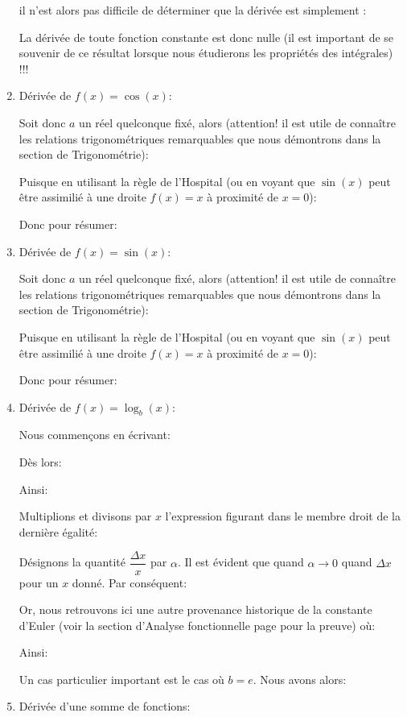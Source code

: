 \begin{enumerate}
		 il n'est alors pas difficile de déterminer que la dérivée est simplement :
		 
		 La dérivée de toute fonction constante est donc nulle (il est important de se souvenir de ce résultat lorsque nous étudierons les propriétés des intégrales) !!!
		 
		 \item Dérivée de $f(x)=\cos(x)$:
		 
		 Soit donc $a$ un réel quelconque fixé, alors (attention! il est utile de connaître les relations trigonométriques remarquables que nous démontrons dans la section de Trigonométrie):
		 
		 Puisque en utilisant la règle de l'Hospital (ou en voyant que $\sin(x)$ peut être assimilié à une droite $f(x)=x$ à proximité de $x=0$):
		 
		 Donc pour résumer:
		 
		 
		 \item Dérivée de $f(x)=\sin(x)$:
		 
		 Soit donc $a$ un réel quelconque fixé, alors  (attention! il est utile de connaître les relations trigonométriques remarquables que nous démontrons dans la section de Trigonométrie):
		 
		 Puisque en utilisant la règle de l'Hospital (ou en voyant que $\sin(x)$ peut être assimilié à une droite $f(x)=x$ à proximité de $x=0$):
		 
		 Donc pour résumer:
		 
		 
		 \item Dérivée de $f(x)=\log_b(x)$:
		 
		 Nous commençons en écrivant:
		 
		 Dès lors:
		 
		 Ainsi:
		 
		 Multiplions et divisons par  $x$ l'expression figurant dans le membre droit de la dernière égalité:
		 
		 Désignons la quantité $\dfrac{\Delta x}{x}$ par $\alpha$. Il est évident que quand $\alpha \rightarrow 0$ quand $\Delta x$ pour un $x$ donné. Par conséquent:
		 
		 Or, nous retrouvons ici une autre provenance historique de la constante d'Euler (voir la section d'Analyse fonctionnelle page \pageref{Euler number} pour la preuve) où:
		 
		 Ainsi:
		 
		 Un cas particulier important est le cas où $b = e$. Nous avons alors:
		  
		 
		 \item Dérivée d'une somme de fonctions:
		 

\end{enumerate}

